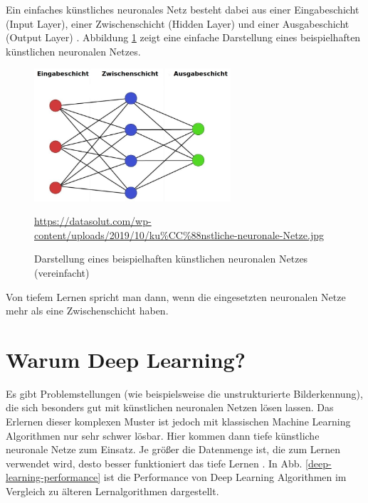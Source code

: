 \newpage

Ein einfaches künstliches neuronales Netz besteht dabei aus einer Eingabeschicht (Input Layer), einer Zwischenschicht (Hidden Layer) und einer Ausgabeschicht (Output Layer) \cite{datasolut2}. Abbildung \ref{simple-net} zeigt eine einfache Darstellung eines beispielhaften künstlichen neuronalen Netzes.

\begin{figure}[H]
	\centering
	\includegraphics[width=0.65\textwidth]{kapitel3/images/Simples_Neuronales_Netz.jpg}
	\caption{Darstellung eines beispielhaften künstlichen neuronalen Netzes \\ (vereinfacht)}
	\label{simple-net}
	\vspace{0.2cm}
	\quelle\url{https://datasolut.com/wp-content/uploads/2019/10/ku%CC%88nstliche-neuronale-Netze.jpg}
\end{figure}

Von tiefem Lernen spricht man dann, wenn die eingesetzten neuronalen Netze mehr als eine Zwischenschicht haben.  \cite{datasolut2} 

\section{Warum Deep Learning?}

Es gibt Problemstellungen (wie beispielsweise die unstrukturierte Bilderkennung), die sich besonders gut mit künstlichen neuronalen Netzen lösen lassen. Das Erlernen dieser komplexen Muster ist jedoch mit klassischen Machine Learning Algorithmen nur sehr schwer lösbar. Hier kommen dann tiefe künstliche neuronale Netze zum Einsatz. Je größer die Datenmenge ist, die zum Lernen verwendet wird, desto besser funktioniert das tiefe Lernen \cite{datasolut2}. In Abb. \ref{deep-learning-performance} ist die Performance von Deep Learning Algorithmen im Vergleich zu älteren Lernalgorithmen dargestellt.


